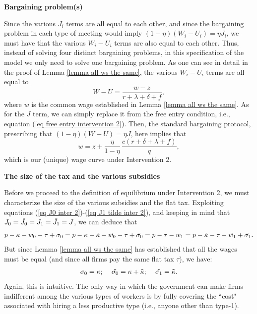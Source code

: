 \documentclass[12pt]{article} %
\theoremstyle{definition}
\begin{document}
\bigskip 

\noindent \textbf{Bargaining problem(s)}

Since the various $J_i$ terms are all equal to each other, and since the bargaining problem in each type of meeting would imply $(1-\eta)(W_i-U_i)=\eta J_i$, we must have that the various $W_i-U_i$ terms are also equal to each other. Thus, instead of solving four distinct bargaining problems, in this specification of the model we only need to solve one bargaining problem. As one can see in detail in the proof of Lemma \ref{lemma all ws the same}, the various $W_i-U_i$ terms are all equal to 
$$
W-U= \frac{w-z}{r+\lambda+\delta+f},   
$$where $w$ is the common wage established in Lemma \ref{lemma all ws the same}. As for the $J$ term, we can simply replace it from the free entry condition, i.e., equation (\ref{eq free entry intervention 2}). Then, the standard bargaining protocol, prescribing that $(1-\eta)(W-U)=\eta J$, here implies that
\begin{equation}
w = z + \frac{\eta}{1-\eta} \, \frac{c(r+\delta+\lambda+f)}{q}, \label{eq wage curve inter 2} 
\end{equation}which is our (unique) wage curve under Intervention 2. 


\bigskip 

\noindent \textbf{The size of the tax and the various subsidies}

\noindent Before we proceed to the definition of equilibrium under Intervention 2, we must characterize the size of the various subsidies and the flat tax. Exploiting equations (\ref{eq J0 inter 2})-(\ref{eq J1 tilde inter 2}), and keeping in mind that $J_0=\Tilde{J_0}=J_1=\Tilde{J_1}=J$, we can deduce that 
$$p-\kappa-w_0-\tau+\sigma_0 = p-\kappa-\Tilde{\kappa}-\Tilde{w_0}-\tau+\Tilde{\sigma_0}=p-\tau-w_1=p-\Tilde{\kappa}-\tau-\Tilde{w_1}+\Tilde{\sigma_1}.$$
But since Lemma \ref{lemma all ws the same} has established that all the wages must be equal (and since all firms pay the same flat tax $\tau$), we have:
\begin{eqnarray}
    \sigma_0=\kappa; \,\,\,\,\,\,\, \Tilde{\sigma_0}=\kappa + \Tilde{\kappa}; \,\,\,\,\,\,\,      \Tilde{\sigma_1}=\Tilde{\kappa}. \label{eq subsidy} 
\end{eqnarray}Again, this is intuitive. The only way in which the government can make firms indifferent among the various types of workers is by fully covering the ``cost" associated with hiring a less productive type (i.e., anyone other than type-1). 
\end{document}
